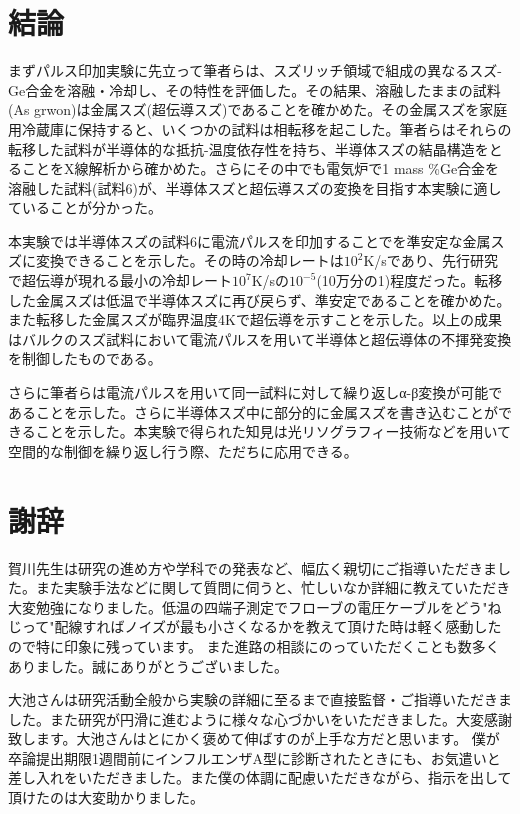 \section{結論}
まずパルス印加実験に先立って筆者らは、スズリッチ領域で組成の異なるスズ-Ge合金を溶融・冷却し、その特性を評価した。その結果、溶融したままの試料(As grwon)は金属スズ(超伝導スズ)であることを確かめた。その金属スズを家庭用冷蔵庫に保持すると、いくつかの試料は相転移を起こした。筆者らはそれらの転移した試料が半導体的な抵抗-温度依存性を持ち、半導体スズの結晶構造をとることをX線解析から確かめた。さらにその中でも電気炉で1 mass \%Ge合金を溶融した試料(試料6)が、半導体スズと超伝導スズの変換を目指す本実験に適していることが分かった。

本実験では半導体スズの試料6に電流パルスを印加することでを準安定な金属スズに変換できることを示した。その時の冷却レートは$10^2$K/sであり、先行研究\cite{oike}で超伝導が現れる最小の冷却レート$10^7$K/sの$10^{-5}$(10万分の1)程度だった。転移した金属スズは低温で半導体スズに再び戻らず、準安定であることを確かめた。また転移した金属スズが臨界温度4Kで超伝導を示すことを示した。以上の成果はバルクのスズ試料において電流パルスを用いて半導体と超伝導体の不揮発変換を制御したものである。

さらに筆者らは電流パルスを用いて同一試料に対して繰り返しα-β変換が可能であることを示した。さらに半導体スズ中に部分的に金属スズを書き込むことができることを示した。本実験で得られた知見は光リソグラフィー技術などを用いて空間的な制御を繰り返し行う際、ただちに応用できる。
\clearpage

\section*{謝辞}
賀川先生は研究の進め方や学科での発表など、幅広く親切にご指導いただきました。また実験手法などに関して質問に伺うと、忙しいなか詳細に教えていただき大変勉強になりました。低温の四端子測定でフローブの電圧ケーブルをどう"ねじって"配線すればノイズが最も小さくなるかを教えて頂けた時は軽く感動したので特に印象に残っています。
また進路の相談にのっていただくことも数多くありました。誠にありがとうございました。

大池さんは研究活動全般から実験の詳細に至るまで直接監督・ご指導いただきました。また研究が円滑に進むように様々な心づかいをいただきました。大変感謝致します。大池さんはとにかく褒めて伸ばすのが上手な方だと思います。
僕が卒論提出期限1週間前にインフルエンザA型に診断されたときにも、お気遣いと差し入れをいただきました。また僕の体調に配慮いただきながら、指示を出して頂けたのは大変助かりました。

